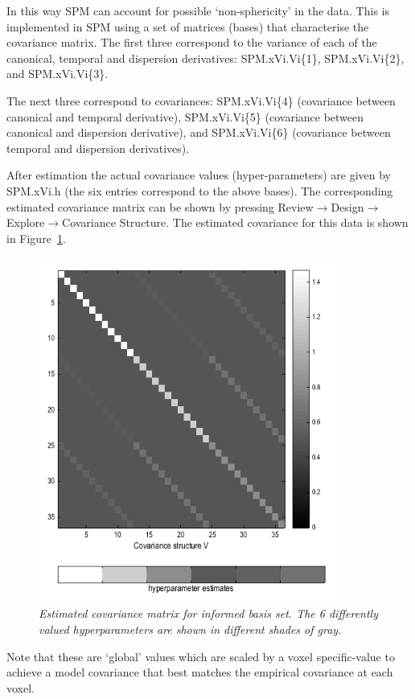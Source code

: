 In this way SPM can account for possible `non-sphericity' in the data. This is implemented in SPM using a set of matrices (bases) that characterise the covariance matrix. The first three correspond to the variance of each of the canonical, temporal and dispersion derivatives:  SPM.xVi.Vi\{1\}, SPM.xVi.Vi\{2\}, and SPM.xVi.Vi\{3\}.

The next three correspond to covariances: SPM.xVi.Vi\{4\} (covariance between canonical and temporal derivative), SPM.xVi.Vi\{5\} (covariance between canonical and dispersion derivative), and SPM.xVi.Vi\{6\} (covariance between temporal and dispersion 
derivatives).

After estimation the actual covariance values (hyper-parameters) are given by SPM.xVi.h (the six entries correspond to the above bases). The corresponding estimated 
covariance matrix can be shown by pressing Review$\rightarrow$Design$\rightarrow$Explore$\rightarrow$Covariance Structure. The estimated covariance for this data is shown in Figure~\ref{informed_covariance}.
\begin{figure}
\begin{center}
\includegraphics[width=100mm]{faces_group/informed_covariance}
\caption{\em Estimated covariance matrix for informed basis set. The 6 differently valued hyperparameters are shown in different shades of gray. \label{informed_covariance}}
\end{center}
\end{figure}
Note that these are `global' values which are scaled by a voxel specific-value to achieve a model covariance that best matches the empirical covariance at each voxel. 


